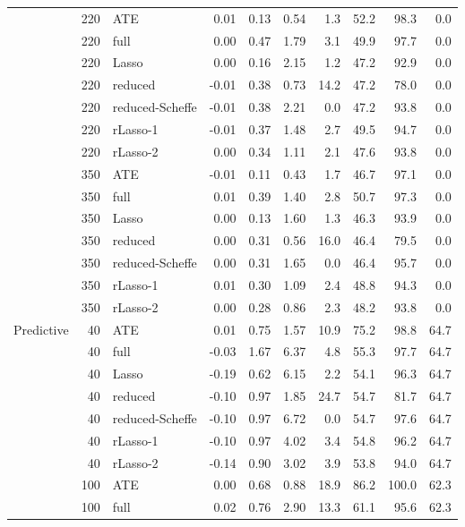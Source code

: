 \begin{table}
\begin{tabular}{lrlrrrrrrr}
   \addrowspace  & 220 & ATE & 0.01 & 0.13 & 0.54 & 1.3 & 52.2 & 98.3 & 0.0 \\ 
   & 220 & full & 0.00 & 0.47 & 1.79 & 3.1 & 49.9 & 97.7 & 0.0 \\ 
   & 220 & Lasso & 0.00 & 0.16 & 2.15 & 1.2 & 47.2 & 92.9 & 0.0 \\ 
   & 220 & reduced & -0.01 & 0.38 & 0.73 & 14.2 & 47.2 & 78.0 & 0.0 \\ 
   & 220 & reduced-Scheffe & -0.01 & 0.38 & 2.21 & 0.0 & 47.2 & 93.8 & 0.0 \\ 
   & 220 & rLasso-1 & -0.01 & 0.37 & 1.48 & 2.7 & 49.5 & 94.7 & 0.0 \\ 
   & 220 & rLasso-2 & 0.00 & 0.34 & 1.11 & 2.1 & 47.6 & 93.8 & 0.0 \\ 
   \addrowspace  & 350 & ATE & -0.01 & 0.11 & 0.43 & 1.7 & 46.7 & 97.1 & 0.0 \\ 
   & 350 & full & 0.01 & 0.39 & 1.40 & 2.8 & 50.7 & 97.3 & 0.0 \\ 
   & 350 & Lasso & 0.00 & 0.13 & 1.60 & 1.3 & 46.3 & 93.9 & 0.0 \\ 
   & 350 & reduced & 0.00 & 0.31 & 0.56 & 16.0 & 46.4 & 79.5 & 0.0 \\ 
   & 350 & reduced-Scheffe & 0.00 & 0.31 & 1.65 & 0.0 & 46.4 & 95.7 & 0.0 \\ 
   & 350 & rLasso-1 & 0.01 & 0.30 & 1.09 & 2.4 & 48.8 & 94.3 & 0.0 \\ 
   & 350 & rLasso-2 & 0.00 & 0.28 & 0.86 & 2.3 & 48.2 & 93.8 & 0.0 \\ 
   \addrowspace Predictive & 40 & ATE & 0.01 & 0.75 & 1.57 & 10.9 & 75.2 & 98.8 & 64.7 \\ 
   & 40 & full & -0.03 & 1.67 & 6.37 & 4.8 & 55.3 & 97.7 & 64.7 \\ 
   & 40 & Lasso & -0.19 & 0.62 & 6.15 & 2.2 & 54.1 & 96.3 & 64.7 \\ 
   & 40 & reduced & -0.10 & 0.97 & 1.85 & 24.7 & 54.7 & 81.7 & 64.7 \\ 
   & 40 & reduced-Scheffe & -0.10 & 0.97 & 6.72 & 0.0 & 54.7 & 97.6 & 64.7 \\ 
   & 40 & rLasso-1 & -0.10 & 0.97 & 4.02 & 3.4 & 54.8 & 96.2 & 64.7 \\ 
   & 40 & rLasso-2 & -0.14 & 0.90 & 3.02 & 3.9 & 53.8 & 94.0 & 64.7 \\ 
   \addrowspace  & 100 & ATE & 0.00 & 0.68 & 0.88 & 18.9 & 86.2 & 100.0 & 62.3 \\ 
   & 100 & full & 0.02 & 0.76 & 2.90 & 13.3 & 61.1 & 95.6 & 62.3 \\ 

\end{tabular}
\end{table}
